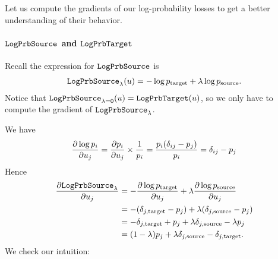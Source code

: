 \documentclass[../main.tex]{subfiles}
\begin{document}
Let us compute the gradients of our log-probability losses to get a better understanding of their behavior.

\paragraph{$\mathtt{LogPrbSource}_{}$ and $\mathtt{LogPrbTarget}$}

Recall the expression for $\mathtt{LogPrbSource}_{}$  is
\begin{align*}
    \mathtt{LogPrbSource}_{\lambda}(u) = - \log p_{\mathrm{target}} + \lambda \log p_{\mathrm{source}}.
\end{align*}
Notice that $\mathtt{LogPrbSource}_{\lambda=0}(u) = \mathtt{LogPrbTarget}(u)$, so we only have to compute the
gradient of $\mathtt{LogPrbSource}_{\lambda}$.

We have
\begin{align*}
    \frac{\partial \log p_i}{\partial u_j}
= \frac{\partial p_i}{\partial u_j} \times \frac{1}{p_i}
= \frac{p_i (\delta_{ij} - p_j) }{p_i}
= \delta_{ij} - p_j
\end{align*}
Hence
\begin{align*}
    \frac{\partial \mathtt{LogPrbSource}_{\lambda}}{\partial u_j}
     & = - \frac{\partial \log p_{\mathrm{target}}}{\partial u_j} + \lambda \frac{\partial \log p_{\mathrm{source}}}{\partial u_j} \\
     & = - (\delta_{j, \mathrm{target}} - p_j) + \lambda (\delta_{j, \mathrm{source}} - p_j)                             \\
     & = - \delta_{j, \mathrm{target}} + p_j + \lambda \delta_{j, \mathrm{source}} - \lambda p_j                         \\
     & = (1 - \lambda) p_j + \lambda \delta_{j, \mathrm{source}} - \delta_{j, \mathrm{target}}.
\end{align*}
We check our intuition:
\end{document}
